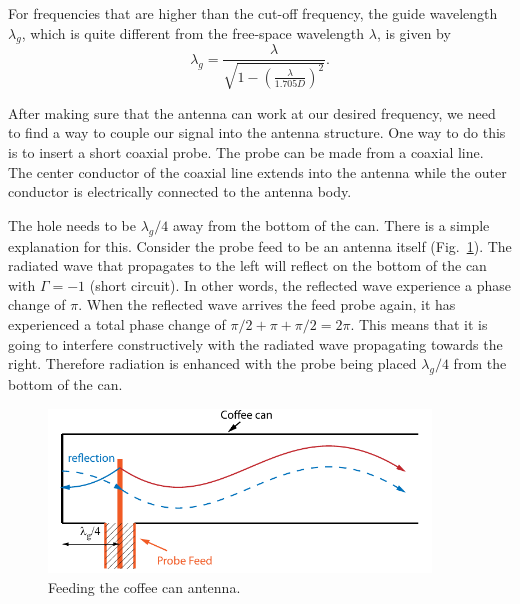 \documentclass[letterpaper, 11pt]{article}
\begin{document}
For frequencies that are higher than the cut-off frequency, the guide wavelength $\lambda_g$, which is quite different from the free-space wavelength $\lambda$, is given by 
\[
	\lambda_g= \frac{\lambda}{\displaystyle \sqrt{1-\left( \frac{\lambda}{\displaystyle  1.705D} \right)^2}}.
\]

After making sure that the antenna can work at our desired frequency, we need to find a way to couple our signal into the antenna structure. One way to do this is to insert a short coaxial probe. The probe can be made from a coaxial line. The center conductor of the coaxial line extends into the antenna while the outer conductor is electrically connected to the antenna body. 

The hole needs to be $\lambda_g/4$ away from the bottom of the can. There is a simple explanation for this. Consider the probe feed to be an antenna itself (Fig.~\ref{fig:coffee-can-feed}). The radiated wave that propagates to the left will reflect on the bottom of the can with $\Gamma =-1$ (short circuit). In other words, the reflected wave experience a phase change of $\pi$. When the reflected wave arrives the feed probe again, it has experienced a total phase change of $\pi/2 + \pi + \pi/2 = 2 \pi$. This means that it is going to interfere constructively with the radiated wave propagating towards the right. Therefore radiation is enhanced with the probe being placed $\lambda_g/4$ from the bottom of the can. 

	\begin{figure}[ht]
		\centering	
		\includegraphics[width=4in]{coffee-can-feed}
		\caption{Feeding the coffee can antenna.}
		\label{fig:coffee-can-feed}
	\end{figure}
\end{document}
